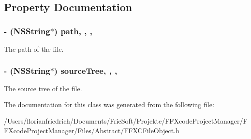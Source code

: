 \subsection{Property Documentation}
\hypertarget{interface_f_f_x_c_file_object_a5552179bb57b10de7dfd8b47e47a76d1}{
\subsubsection[{path}]{\setlength{\rightskip}{0pt plus 5cm}-\/ (N\-S\-String$\ast$) path\hspace{0.3cm}{\ttfamily [read]}, {\ttfamily [write]}, {\ttfamily [nonatomic]}, {\ttfamily [strong]}}}\label{interface_f_f_x_c_file_object_a5552179bb57b10de7dfd8b47e47a76d1}
The path of the file. \hypertarget{interface_f_f_x_c_file_object_a7e2268306d098ba91483be6df120fc5a}{
\subsubsection[{source\-Tree}]{\setlength{\rightskip}{0pt plus 5cm}-\/ (N\-S\-String$\ast$) source\-Tree\hspace{0.3cm}{\ttfamily [read]}, {\ttfamily [write]}, {\ttfamily [nonatomic]}, {\ttfamily [strong]}}}\label{interface_f_f_x_c_file_object_a7e2268306d098ba91483be6df120fc5a}
The source tree of the file. 

The documentation for this class was generated from the following file\-:\begin{DoxyCompactItemize}
\item 
/\-Users/florianfriedrich/\-Documents/\-Frie\-Soft/\-Projekte/\-F\-F\-Xcode\-Project\-Manager/\-F\-F\-Xcode\-Project\-Manager/\-Files/\-Abstract/F\-F\-X\-C\-File\-Object.\-h\end{DoxyCompactItemize}
